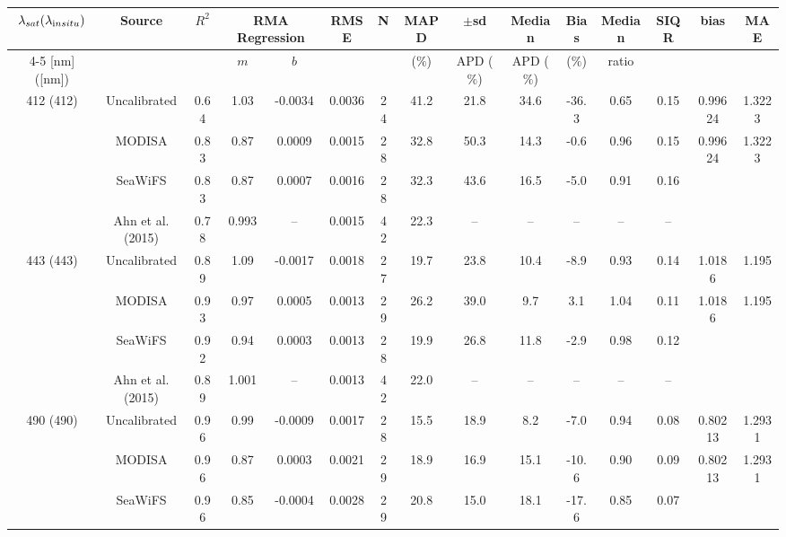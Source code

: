 \documentclass[preview]{standalone}
\begin{document}
\tiny

\tiny
\centering
\begin{tabular}{ccccccccccccccc} 
 \hline 
$\lambda_{sat} (\lambda_{\text in situ})$ & Source & $R^2$ & \multicolumn{2}{c}{RMA Regression} & RMSE & N & MAPD & $\pm$sd & Median & Bias & Median & SIQR & bias & MAE\\ \cline{4-5}
[nm]([nm])                  &              &         & $m$     & $b$     &             &     & ($\%$)  & APD ($\%$)  & APD ($\%$)  & ($\%$)   & ratio   &         \\ \hline 
 \hline  
\multirow{3}{*}{412 (412)} 	& Uncalibrated 	& 0.64 & 1.03 & -0.0034 & 0.0036 & 24 & 41.2 & 21.8 & 34.6 & -36.3 & 0.65 & 0.15 & 0.99624 & 1.3223\\ 
							& MODISA 		& 0.83 & 0.87 & 0.0009 & 0.0015 & 28 & 32.8 & 50.3 & 14.3 & -0.6 & 0.96 & 0.15& 0.99624 & 1.3223\\ 
							& SeaWiFS 		& 0.83 & 0.87 & 0.0007 & 0.0016 & 28 & 32.3 & 43.6 & 16.5 & -5.0 & 0.91 & 0.16 \\ 
							& Ahn et al. (2015) & 0.78 & 0.993 & -- & 0.0015 & 42 & 22.3 & -- & -- & -- & -- & -- \\ \hline
\multirow{3}{*}{443 (443)} 	& Uncalibrated 	& 0.89 & 1.09 & -0.0017 & 0.0018 & 27 & 19.7 & 23.8 & 10.4 & -8.9 & 0.93 & 0.14  &  1.0186 &  1.195\\ 
 							& MODISA 		& 0.93 & 0.97 & 0.0005 & 0.0013 & 29 & 26.2 & 39.0 & 9.7 & 3.1 & 1.04 & 0.11 &  1.0186 &  1.195\\ 
 							& SeaWiFS 		& 0.92 & 0.94 & 0.0003 & 0.0013 & 28 & 19.9 & 26.8 & 11.8 & -2.9 & 0.98 & 0.12 \\ 
 							& Ahn et al. (2015) & 0.89 & 1.001 & -- & 0.0013 & 42 & 22.0 & -- & -- & -- & -- & -- \\ \hline
\multirow{3}{*}{490 (490)} 	& Uncalibrated 	& 0.96 & 0.99 & -0.0009 & 0.0017 & 28 & 15.5 & 18.9 & 8.2 & -7.0 & 0.94 & 0.08 & 0.80213 & 1.2931\\ 
 							& MODISA 		& 0.96 & 0.87 & 0.0003 & 0.0021 & 29 & 18.9 & 16.9 & 15.1 & -10.6 & 0.90 & 0.09 & 0.80213 & 1.2931\\ 
 							& SeaWiFS 		& 0.96 & 0.85 & -0.0004 & 0.0028 & 29 & 20.8 & 15.0 & 18.1 & -17.6 & 0.85 & 0.07  \\ 

\end{tabular}
\end{document}
